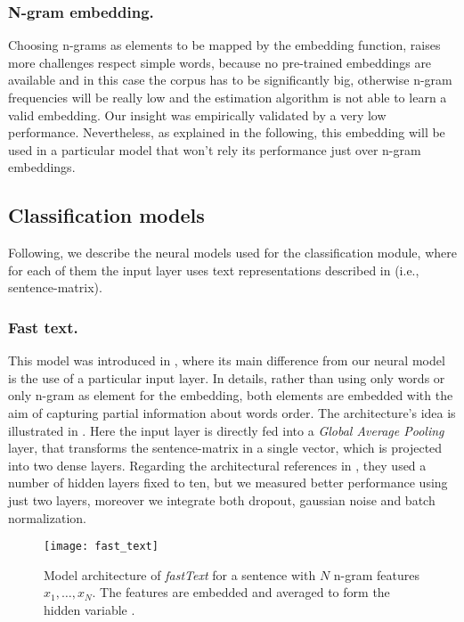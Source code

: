 \subsubsection{N-gram embedding.}
Choosing n-grams as elements to be mapped by the embedding function, raises more challenges respect simple words, because no pre-trained embeddings are available and in this case the corpus has to be significantly big, otherwise n-gram frequencies will be really low and the estimation algorithm is not able to learn a valid embedding.
Our insight was empirically validated by a very low performance. Nevertheless, as explained in the following, this embedding will be used in a particular model that won't rely its performance just over n-gram embeddings.


\subsection{Classification models} \label{subsec:classificationModel}
Following, we describe the neural models used for the classification module, where for each of them the input layer uses text representations described in  (i.e., sentence-matrix).


\subsubsection{Fast text.}
This model was introduced in \cite{joulin2016bag}, where its main difference from our neural model is the use of a particular input layer. In details, rather than using only words or only n-gram as element for the embedding, both elements are embedded with the aim of capturing partial information about words order.
The architecture's idea  is illustrated in . Here the input layer is directly fed into a \emph{Global Average Pooling} layer, that transforms the sentence-matrix in a single vector, which is projected into two dense layers.
Regarding the architectural references in \cite{joulin2016bag}, they used a number of hidden layers fixed to ten, but we measured better performance using just two layers, moreover we integrate both dropout, gaussian noise and batch normalization.

\begin{figure}[h]
\footnotesize
\centering
\texttt{[image: fast\_text]}
\caption{Model architecture of \emph{fastText} for a sentence with $N$ n-gram features $x_1,\dots,x_N$. The features are embedded and averaged to form the hidden variable \cite{joulin2016bag}.}
\label{fig:fastText}
\end{figure}


